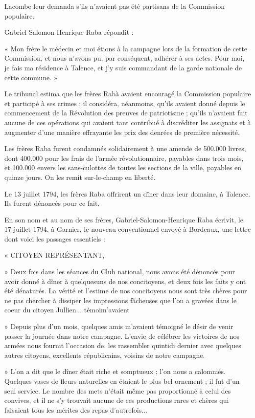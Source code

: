 Lacombe leur demanda s'ils n'avaient pas été partisans de la Commission populaire.

Gabriel-Salomon-Henrique Raba répondit :

« Mon frère le médecin et moi étions à la campagne lors de la formation de cette Commission, et nous n'avons pu, par conséquent, adhérer à ses actes. Pour moi, je fais ma résidence à Talence, et j'y suis commandant de la garde nationale de cette commune. »

Le tribunal estima que les frères Rabà avaient encouragé la Commission populaire et participé à ses crimes ; il considéra, néanmoins, qu'ils avaient donné depuis le commencement de la Révolution des preuves de patriotisme ; qu'ils n'avaient fait aucune de ces opérations qui avaient tant contribué à discréditer les assignats et à augmenter d'une manière effrayante les prix des denrées de première nécessité.

Les frères Raba furent condamnés solidairement à une amende de 500.000 livres, dont 400.000 pour les frais de l'armée révolutionnaire, payables dans trois mois, et 100.000 envers les sans-culottes de toutes les sections de la ville, payables en quinze jours. On les remit sur-le-champ en liberté.

Le 13 juillet 1794, les frères Raba offrirent un dîner dans leur domaine, à Talence. Ils furent dénoncés pour ce fait. 

En son nom et au nom de ses frères, Gabriel-Salomon-Henrique Raba écrivit, le 17 juillet 1794, à Garnier, le nouveau conventionnel envoyé à Bordeaux, une lettre dont voici les passages essentiels :

« CITOYEN REPRÉSENTANT, 

» Deux fois dans les séances du Club national, nous avons été dénoncés pour avoir donné à dîner à quelquesuns de nos concitoyens, et deux fois les faits y ont été dénaturés. La vérité et l'estime de nos concitoyens nous sont très chères pour ne pas chercher à dissiper les impressions fâcheuses que l'on a gravées dans le coeur du citoyen Jullien... témoim'avaient 

» Depuis plus d'un mois, quelques amis m'avaient témoigné le désir de venir passer la journée dans notre campagne. L'envie de célébrer les victoires de nos armées nous fournit l'occasion de. les rassembler quintidi dernier avec quelques autres citoyens, excellents républicains, voisins de notre campagne. 

» L'on a dit que le dîner était riche et somptueux ; l'on nous a calomniés. Quelques vases de fleurs naturelles en étaient le plus bel ornement ; il fut d'un seul service. Le nombre des mets n'était même pas proportionné à celui des convives, et il ne s'y trouvait aucune de ces productions rares et chères qui faisaient tous les mérites des repas d'autrefois... 

